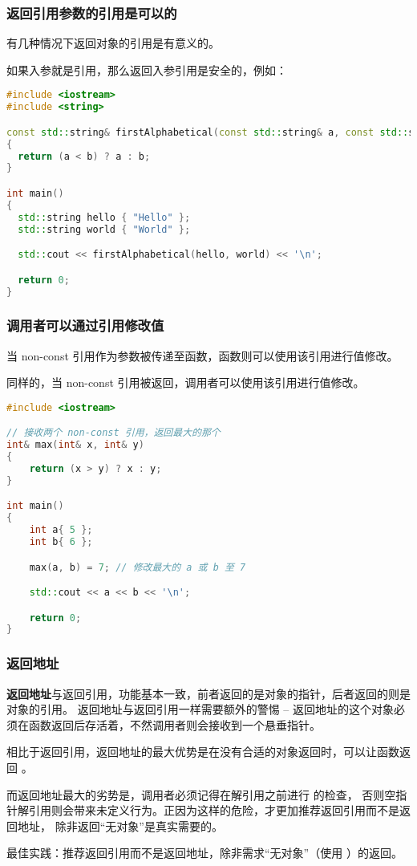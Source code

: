 \documentclass[../../LearnCpp.tex]{subfiles}
\begin{document}
\subsubsection*{返回引用参数的引用是可以的}

有几种情况下返回对象的引用是有意义的。

如果入参就是引用，那么返回入参引用是安全的，例如：

\begin{lstlisting}[language=C++]
#include <iostream>
#include <string>

const std::string& firstAlphabetical(const std::string& a, const std::string& b)
{
  return (a < b) ? a : b;
}

int main()
{
  std::string hello { "Hello" };
  std::string world { "World" };

  std::cout << firstAlphabetical(hello, world) << '\n';

  return 0;
}
\end{lstlisting}

\subsubsection*{调用者可以通过引用修改值}

当 non-const 引用作为参数被传递至函数，函数则可以使用该引用进行值修改。

同样的，当 non-const 引用被返回，调用者可以使用该引用进行值修改。

\begin{lstlisting}[language=C++]
#include <iostream>

// 接收两个 non-const 引用，返回最大的那个
int& max(int& x, int& y)
{
    return (x > y) ? x : y;
}

int main()
{
    int a{ 5 };
    int b{ 6 };

    max(a, b) = 7; // 修改最大的 a 或 b 至 7

    std::cout << a << b << '\n';

    return 0;
}
\end{lstlisting}

\subsubsection*{返回地址}

\textbf{返回地址}与返回引用，功能基本一致，前者返回的是对象的指针，后者返回的则是对象的引用。
返回地址与返回引用一样需要额外的警惕 -- 返回地址的这个对象必须在函数返回后存活着，不然调用者则会接收到一个悬垂指针。

相比于返回引用，返回地址的最大优势是在没有合适的对象返回时，可以让函数返回 。

而返回地址最大的劣势是，调用者必须记得在解引用之前进行  的检查，
否则空指针解引用则会带来未定义行为。正因为这样的危险，才更加推荐返回引用而不是返回地址，
除非返回“无对象”是真实需要的。

最佳实践：推荐返回引用而不是返回地址，除非需求“无对象”（使用 ）的返回。
\end{document}
